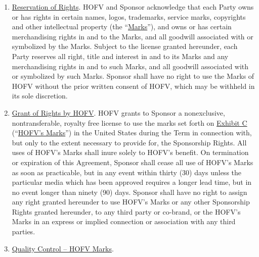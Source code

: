 \documentclass{article}
\begin{document}
\begin{enumerate}
  \begin{enumerate}
  \def\labelenumii{\arabic{enumii}.}
  \item
    \uline{Reservation of Rights}. HOFV and Sponsor acknowledge that
    each Party owns or has rights in certain names, logos, trademarks,
    service marks, copyrights and other intellectual property (the
    ``\uline{Marks}''), and owns or has certain merchandising rights in
    and to the Marks, and all goodwill associated with or symbolized by
    the Marks. Subject to the license granted hereunder, each Party
    reserves all right, title and interest in and to its Marks and any
    merchandising rights in and to such Marks, and all goodwill
    associated with or symbolized by such Marks. Sponsor shall have no
    right to use the Marks of HOFV without the prior written consent of
    HOFV, which may be withheld in its sole discretion.
  \item
    \uline{Grant of Rights by HOFV}. HOFV grants to Sponsor a
    nonexclusive, nontransferable, royalty free license to use the marks
    set forth on \uline{Exhibit C} (``\uline{HOFV's Marks}'') in the
    United States during the Term in connection with, but only to the
    extent necessary to provide for, the Sponsorship Rights. All uses of
    HOFV's Marks shall inure solely to HOFV's benefit. On termination or
    expiration of this Agreement, Sponsor shall cease all use of HOFV's
    Marks as soon as practicable, but in any event within thirty (30)
    days unless the particular media which has been approved requires a
    longer lead time, but in no event longer than ninety (90) days.
    Sponsor shall have no right to assign any right granted hereunder to
    use HOFV's Marks or any other Sponsorship Rights granted hereunder,
    to any third party or co-brand, or the HOFV's Marks in an express or
    implied connection or association with any third parties.
  \item
    \uline{Quality Control -- HOFV Marks}.


\end{enumerate}
\end{enumerate}
\end{document}
